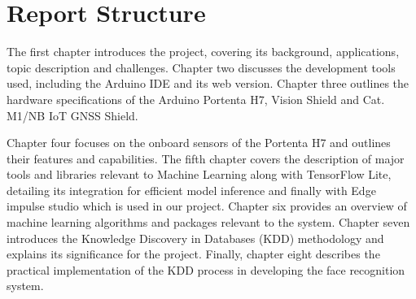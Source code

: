 \section{Report Structure}
The first chapter introduces the project, covering its background, applications, topic description and challenges. Chapter two discusses the development tools used, including the Arduino IDE and its web version. Chapter three outlines the hardware specifications of the Arduino Portenta H7, Vision Shield and Cat. M1/NB IoT GNSS Shield.

Chapter four focuses on the onboard sensors of the Portenta H7 and outlines their features and capabilities. The fifth chapter covers the description of major tools and libraries relevant to Machine Learning along with TensorFlow Lite, detailing its integration for efficient model inference and finally with Edge impulse studio which is used in our project. Chapter six provides an overview of machine learning algorithms and packages relevant to the system. Chapter seven introduces the Knowledge Discovery in Databases (KDD) methodology and explains its significance for the project. Finally, chapter eight describes the practical implementation of the KDD process in developing the face recognition system.